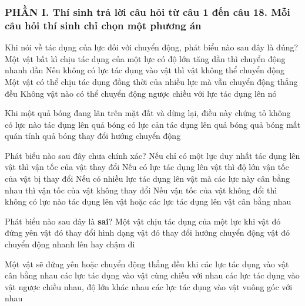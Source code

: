\subsubsection*{PHẦN I. Thí sinh trả lời câu hỏi từ câu 1 đến câu 18. Mỗi câu hỏi thí sinh chỉ chọn một phương án}
\setcounter{ex}{0}
\begin{ex}%
Khi nói về tác dụng của lực đối với chuyển động, phát biểu nào sau đây là đúng?
\choice
{Một vật bất kì chịu tác dụng của một lực có độ lớn tăng dần thì chuyển động nhanh dần}
{Nếu không có lực tác dụng vào vật thì vật không thể chuyển động}
{\True Một vật có thể chịu tác dụng đồng thời của nhiều lực mà vẫn chuyển động thẳng đều}
{Không vật nào có thể chuyển động ngược chiều với lực tác dụng lên nó}
 \end{ex}
\begin{ex}%
Khi một quả bóng đang lăn trên mặt đất và dừng lại, điều này chứng tỏ
\choice
{không có lực nào tác dụng lên quả bóng}
{\True có lực cản tác dụng lên quả bóng}
{quả bóng mất quán tính}
{quả bóng thay đổi hướng chuyển động}
\loigiai{

}
\end{ex}
\begin{ex}%
Phát biểu nào sau đây chưa chính xác?
\choice
{Nếu chỉ có một lực duy nhất tác dụng lên vật thì vận tốc của vật thay đổi}
{\True Nếu có lực tác dụng lên vật thì độ lớn vận tốc của vật bị thay đổi}
{Nếu có nhiều lực tác dụng lên vật mà các lực này cân bằng nhau thì vận tốc của vật không thay đổi}
{Nếu vận tốc của vật không đổi thì không có lực nào tác dụng lên vật hoặc các lực tác dụng lên vật cân bằng nhau}
 \end{ex}
\begin{ex}%
Phát biểu nào sau đây là \textbf{sai}? Một vật chịu tác dụng của một lực khi
\choice
{\True vật đó đứng yên}
{vật đó thay đổi hình dạng}
{vật đó thay đổi hướng chuyển động}
{vật đó chuyển động nhanh lên hay chậm đi}
 \end{ex}
\begin{ex}%
Một vật sẽ đứng yên hoặc chuyển động thẳng đều khi
\choice
{\True các lực tác dụng vào vật cân bằng nhau}
{các lực tác dụng vào vật cùng chiều với nhau}
{các lực tác dụng vào vật ngược chiều nhau, độ lớn khác nhau}
{các lực tác dụng vào vật vuông góc với nhau}
\end{ex}
